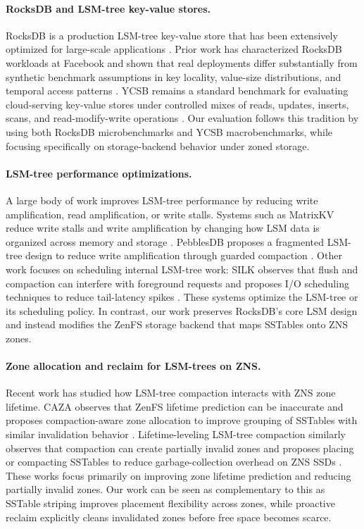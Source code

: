 \documentclass[letterpaper,twocolumn,10pt]{article}
\begin{document}
\paragraph{RocksDB and LSM-tree key-value stores.}
RocksDB is a production LSM-tree key-value store that has been extensively optimized for large-scale applications \cite{dong2021rocksdb}. Prior work has characterized RocksDB workloads at Facebook and shown that real deployments differ substantially from synthetic benchmark assumptions in key locality, value-size distributions, and temporal access patterns \cite{cao2020rocksdbworkloads}. YCSB remains a standard benchmark for evaluating cloud-serving key-value stores under controlled mixes of reads, updates, inserts, scans, and read-modify-write operations \cite{cooper2010ycsb}. Our evaluation follows this tradition by using both RocksDB microbenchmarks and YCSB macrobenchmarks, while focusing specifically on storage-backend behavior under zoned storage.

\paragraph{LSM-tree performance optimizations.}
A large body of work improves LSM-tree performance by reducing write amplification, read amplification, or write stalls. Systems such as MatrixKV reduce write stalls and write amplification by changing how LSM data is organized across memory and storage \cite{yao2020matrixkv}. PebblesDB proposes a fragmented LSM-tree design to reduce write amplification through guarded compaction \cite{raju2017pebblesdb}. Other work focuses on scheduling internal LSM-tree work: SILK observes that flush and compaction can interfere with foreground requests and proposes I/O scheduling techniques to reduce tail-latency spikes \cite{balmau2019silk}. These systems optimize the LSM-tree or its scheduling policy. In contrast, our work preserves RocksDB's core LSM design and instead modifies the ZenFS storage backend that maps SSTables onto ZNS zones.

\paragraph{Zone allocation and reclaim for LSM-trees on ZNS.}
Recent work has studied how LSM-tree compaction interacts with ZNS zone lifetime. CAZA observes that ZenFS lifetime prediction can be inaccurate and proposes compaction-aware zone allocation to improve grouping of SSTables with similar invalidation behavior \cite{lee2022caza}. Lifetime-leveling LSM-tree compaction similarly observes that compaction can create partially invalid zones and proposes placing or compacting SSTables to reduce garbage-collection overhead on ZNS SSDs \cite{jung2022lifetime}. These works focus primarily on improving zone lifetime prediction and reducing partially invalid zones. Our work can be seen as complementary to this as SSTable striping improves placement flexibility across zones, while proactive reclaim explicitly cleans invalidated zones before free space becomes scarce.
\end{document}
